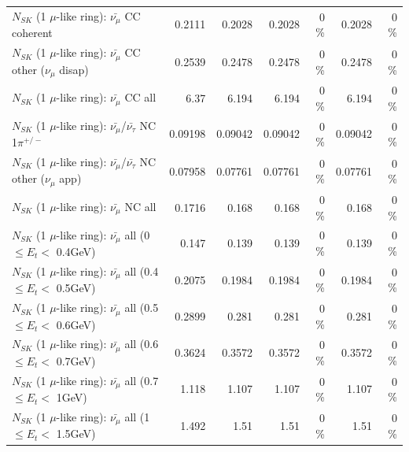 \begin{table}
\begin{tabular}{| l | r | r | r  r | r  r |}
                       $N_{SK}$ (1 $\mu$-like ring): $\bar{\nu_\mu}$ CC coherent &          0.2111 &          0.2028 &          0.2028 &        0 \%  &          0.2028 &        0 \%  \\ 
        $N_{SK}$ (1 $\mu$-like ring): $\bar{\nu_\mu}$ CC other ($\nu_\mu$ disap) &          0.2539 &          0.2478 &          0.2478 &        0 \%  &          0.2478 &        0 \%  \\ 
                          $N_{SK}$ (1 $\mu$-like ring): $\bar{\nu_{\mu}}$ CC all &            6.37 &           6.194 &           6.194 &        0 \%  &           6.194 &        0 \%  \\ 
\hline
  $N_{SK}$ (1 $\mu$-like ring): $\bar{\nu_\mu}$/$\bar{\nu_\tau}$ NC 1$\pi^{+/-}$ &         0.09198 &         0.09042 &         0.09042 &        0 \%  &         0.09042 &        0 \%  \\ 
$N_{SK}$ (1 $\mu$-like ring): $\bar{\nu_\mu}$/$\bar{\nu_\tau}$ NC other ($\nu_\mu$ app) &         0.07958 &         0.07761 &         0.07761 &        0 \%  &         0.07761 &        0 \%  \\ 
                          $N_{SK}$ (1 $\mu$-like ring): $\bar{\nu_{\mu}}$ NC all &          0.1716 &           0.168 &           0.168 &        0 \%  &           0.168 &        0 \%  \\ 
\hline
   $N_{SK}$ (1 $\mu$-like ring): $\bar{\nu_{\mu}}$ all (0 $\leq E_{t} <$ 0.4GeV) &           0.147 &           0.139 &           0.139 &        0 \%  &           0.139 &        0 \%  \\ 
 $N_{SK}$ (1 $\mu$-like ring): $\bar{\nu_{\mu}}$ all (0.4 $\leq E_{t} <$ 0.5GeV) &          0.2075 &          0.1984 &          0.1984 &        0 \%  &          0.1984 &        0 \%  \\ 
 $N_{SK}$ (1 $\mu$-like ring): $\bar{\nu_{\mu}}$ all (0.5 $\leq E_{t} <$ 0.6GeV) &          0.2899 &           0.281 &           0.281 &        0 \%  &           0.281 &        0 \%  \\ 
 $N_{SK}$ (1 $\mu$-like ring): $\bar{\nu_{\mu}}$ all (0.6 $\leq E_{t} <$ 0.7GeV) &          0.3624 &          0.3572 &          0.3572 &        0 \%  &          0.3572 &        0 \%  \\ 
   $N_{SK}$ (1 $\mu$-like ring): $\bar{\nu_{\mu}}$ all (0.7 $\leq E_{t} <$ 1GeV) &           1.118 &           1.107 &           1.107 &        0 \%  &           1.107 &        0 \%  \\ 
   $N_{SK}$ (1 $\mu$-like ring): $\bar{\nu_{\mu}}$ all (1 $\leq E_{t} <$ 1.5GeV) &           1.492 &            1.51 &            1.51 &        0 \%  &            1.51 &        0 \%  \\ 

\end{tabular}
\end{table}
